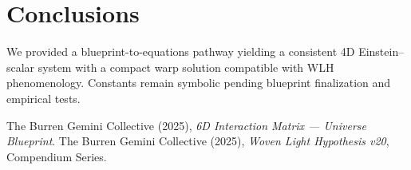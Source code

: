 \documentclass[12pt]{article}
\begin{document}
\section*{Conclusions}
We provided a blueprint-to-equations pathway yielding a consistent 4D Einstein--scalar system with a compact warp solution compatible with WLH phenomenology. Constants remain symbolic pending blueprint finalization and empirical tests.

\begin{thebibliography}{9}
The Burren Gemini Collective (2025), \emph{6D Interaction Matrix --- Universe Blueprint}. 
The Burren Gemini Collective (2025), \emph{Woven Light Hypothesis v20}, Compendium Series.
\end{thebibliography}
\end{document}
